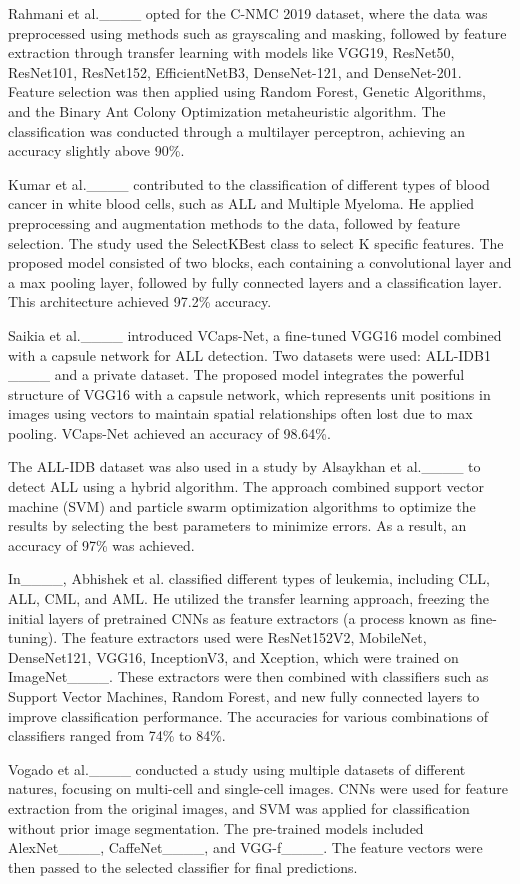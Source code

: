 Rahmani et al.____ opted for the C-NMC 2019 dataset, where the data was preprocessed using methods such as grayscaling and masking, followed by feature extraction through transfer learning with models like VGG19, ResNet50, ResNet101, ResNet152, EfficientNetB3, DenseNet-121, and DenseNet-201. Feature selection was then applied using Random Forest, Genetic Algorithms, and the Binary Ant Colony Optimization metaheuristic algorithm. The classification was conducted through a multilayer perceptron, achieving an accuracy slightly above 90\%.

Kumar et al.____ contributed to the classification of different types of blood cancer in white blood cells, such as ALL and Multiple Myeloma. He applied preprocessing and augmentation methods to the data, followed by feature selection. The study used the SelectKBest class to select K specific features. The proposed model consisted of two blocks, each containing a convolutional layer and a max pooling layer, followed by fully connected layers and a classification layer. This architecture achieved 97.2\% accuracy.

Saikia et al.____ introduced VCaps-Net, a fine-tuned VGG16 model combined with a capsule network for ALL detection. Two datasets were used: ALL-IDB1 ____ and a private dataset. The proposed model integrates the powerful structure of VGG16 with a capsule network, which represents unit positions in images using vectors to maintain spatial relationships often lost due to max pooling. VCaps-Net achieved an accuracy of 98.64\%.

The ALL-IDB dataset was also used in a study by Alsaykhan et al.____ to detect ALL using a hybrid algorithm. The approach combined support vector machine (SVM) and particle swarm optimization algorithms to optimize the results by selecting the best parameters to minimize errors. As a result, an accuracy of 97\% was achieved.

In____, Abhishek et al. classified different types of leukemia, including CLL, ALL, CML, and AML. He utilized the transfer learning approach, freezing the initial layers of pretrained CNNs as feature extractors (a process known as fine-tuning). The feature extractors used were ResNet152V2, MobileNet, DenseNet121, VGG16, InceptionV3, and Xception, which were trained on ImageNet____. These extractors were then combined with classifiers such as Support Vector Machines, Random Forest, and new fully connected layers to improve classification performance. The accuracies for various combinations of classifiers ranged from 74\% to 84\%.

Vogado et al.____ conducted a study using multiple datasets of different natures, focusing on multi-cell and single-cell images. CNNs were used for feature extraction from the original images, and SVM was applied for classification without prior image segmentation. The pre-trained models included AlexNet____, CaffeNet____, and VGG-f____. The feature vectors were then passed to the selected classifier for final predictions.